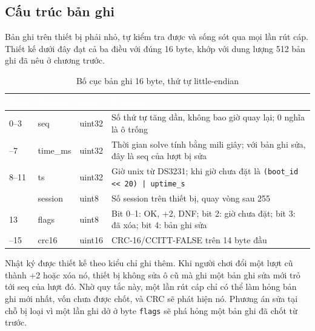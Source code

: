 \subsection{Cấu trúc bản ghi}
\label{sec:record}
Bản ghi trên thiết bị phải nhỏ, tự kiểm tra được và sống sót qua mọi lần rút cáp. Thiết kế dưới đây đạt cả ba điều với đúng 16 byte, khớp với dung lượng 512 bản ghi đã nêu ở chương trước.

\begin{table}[H]
    \centering
    \small
    \renewcommand{\arraystretch}{1.35}
    \caption{Bố cục bản ghi 16 byte, thứ tự little-endian}
    \label{tab:record}
    \begin{tabular}{>{\centering\arraybackslash}m{1.2cm} >{\ttfamily\raggedright\arraybackslash}m{2.0cm} >{\raggedright\arraybackslash}m{1.6cm} >{\raggedright\arraybackslash}m{9.0cm}}
        \toprule
        \rowcolor{haitayblue}
        \textcolor{white}{Byte} & \textcolor{white}{Trường} & \textcolor{white}{Kiểu} & \textcolor{white}{Ý nghĩa} \\
        \midrule
        \rowcolor{haitayblue!8}
        0--3 & seq & uint32 & Số thứ tự tăng dần, không bao giờ quay lại; 0 nghĩa là ô trống \\
        4--7 & time\_ms & uint32 & Thời gian solve tính bằng mili giây; với bản ghi sửa, đây là seq của lượt bị sửa \\
        \rowcolor{haitayblue!8}
        8--11 & ts & uint32 & Giờ unix từ DS3231; khi giờ chưa đặt là \texttt{(boot\_id << 20) | uptime\_s} \\
        12 & session & uint8 & Số session trên thiết bị, quay vòng sau 255 \\
        \rowcolor{haitayblue!8}
        13 & flags & uint8 & Bit 0--1: OK, +2, DNF; bit 2: giờ chưa đặt; bit 3: đã xóa; bit 4: bản ghi sửa \\
        14--15 & crc16 & uint16 & CRC-16/CCITT-FALSE trên 14 byte đầu \\
        \bottomrule
    \end{tabular}
\end{table}

Nhật ký được thiết kế theo kiểu chỉ ghi thêm. Khi người chơi đổi một lượt cũ thành +2 hoặc xóa nó, thiết bị không sửa ô cũ mà ghi một bản ghi sửa mới trỏ tới seq của lượt đó. Nhờ quy tắc này, một lần rút cáp chỉ có thể làm hỏng bản ghi mới nhất, vốn chưa được chốt, và CRC sẽ phát hiện nó. Phương án sửa tại chỗ bị loại vì một lần ghi dở ở byte \texttt{flags} sẽ phá hỏng một bản ghi đã chốt từ trước.

